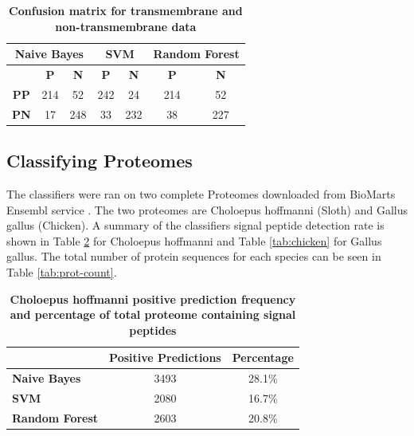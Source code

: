 \documentclass[10pt,letterpaper]{article}
\begin{document}
\begin{table}[!ht]
	\centering
	\caption{{\bf Confusion matrix for transmembrane and non-transmembrane data }}
	\label{tab:conf-all}
	\begin{tabular}{ccccccc}
		\multicolumn{3}{c}{Naive Bayes}                            & \multicolumn{2}{c}{SVM}                      & \multicolumn{2}{c}{Random Forest} \\ \hline
		& \textbf{P} & \multicolumn{1}{c|}{\textbf{N}} & \textbf{P} & \multicolumn{1}{c|}{\textbf{N}} & \textbf{P}      & \textbf{N}      \\ \hline
		\textbf{PP} & 214        & \multicolumn{1}{c|}{52}         & 242        & \multicolumn{1}{c|}{24}         & 214             & 52              \\
		\textbf{PN} & 17         & \multicolumn{1}{c|}{248}        & 33         & \multicolumn{1}{c|}{232}        & 38              & 227             \\ \hline
	\end{tabular}
\end{table}
	
	\subsection*{Classifying Proteomes}
	The classifiers were ran on two complete Proteomes downloaded from BioMarts Ensembl service \cite{ensembl}. The two proteomes are Choloepus hoffmanni (Sloth) and Gallus gallus (Chicken). A summary of the classifiers signal peptide detection rate is shown in Table \ref{tab:sloth} for Choloepus hoffmanni and Table \ref{tab:chicken} for Gallus gallus. The total number of protein sequences for each species can be seen in Table \ref{tab:prot-count}.
	
	\begin{table}[!ht]
		\centering
		\caption{{\bf Choloepus hoffmanni positive prediction frequency and percentage of total proteome containing signal peptides}}
		\label{tab:sloth}
		\begin{tabular}{@{}lcc@{}}
			\toprule
			& \multicolumn{1}{l}{Positive Predictions} & \multicolumn{1}{l}{Percentage} \\ \midrule
			\textbf{Naive Bayes}   & 3493                                     & 28.1\%                         \\
			\textbf{SVM}           & 2080                                     & 16.7\%                         \\
			\textbf{Random Forest} & 2603                                     & 20.8\%                        
		\end{tabular}
	\end{table}
	
\end{document}
